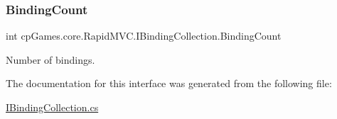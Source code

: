 \subsubsection{\texorpdfstring{BindingCount}{BindingCount}}
{\footnotesize\ttfamily int cp\+Games.\+core.\+Rapid\+M\+V\+C.\+I\+Binding\+Collection.\+Binding\+Count\hspace{0.3cm}{\ttfamily [get]}}



Number of bindings. 



The documentation for this interface was generated from the following file\+:\begin{DoxyCompactItemize}
\item 
\mbox{\hyperlink{_i_binding_collection_8cs}{I\+Binding\+Collection.\+cs}}\end{DoxyCompactItemize}
